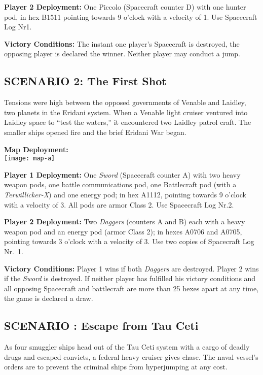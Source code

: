 \textbf{Player 2 Deployment:} One Piccolo (Spacecraft counter D) with
one hunter pod, in hex B1511 pointing towards 9 o'clock with a
velocity of 1. Use Spacecraft Log Nr1.

\textbf{Victory Conditions:} The instant one player's Spacecraft is
destroyed, the opposing player is declared the winner. Neither player
may conduct a jump.



\subsection*{SCENARIO 2: The First Shot}
\label{sec:scenario-2:-first}

Tensions were high between the opposed governments of Venable and
Laidley, two planets in the Eridani system. When a Venable light
cruiser ventured into Laidley space to ``test the waters,'' it
encountered two Laidley patrol craft. The smaller ships opened fire
and the brief Eridani War began.

\textbf{Map Deployment:}\\
\texttt{[image: map-a]}

\textbf{Player 1 Deployment:} One \emph{Sword} (Spacecraft counter A)
with two heavy weapon pods, one battle communications pod, one
Battlecraft pod (with a \emph{Terwillicker-X}) and one energy pod; in
hex A1112, pointing towards 9 o'clock with a velocity of 3. All pods
are armor Class 2. Use Spacecraft Log Nr.2.

\textbf{Player 2 Deployment:} Two \emph{Daggers} (counters A and B)
each with a heavy weapon pod and an energy pod (armor Class 2); in
hexes A0706 and A0705, pointing towards 3 o'clock with a velocity of
3. Use two copies of Spacecraft Log Nr.~1.

\textbf{Victory Conditions:} Player 1 wins if both \emph{Daggers} are
destroyed. Player 2 wins if the \emph{Sword} is destroyed. If neither
player has fulfilled his victory conditions and all opposing
Spacecraft and battlecraft are more than 25 hexes apart at any time,
the game is declared a draw.



\subsection*{SCENARIO \thescenario: Escape from Tau Ceti}
\label{sec:scenario-3:-escape}

As four smuggler ships head out of the Tau Ceti system with a cargo of
deadly drugs and escaped convicts, a federal heavy cruiser gives
chase. The naval vessel's orders are to prevent the criminal ships
from hyperjumping at any cost.

